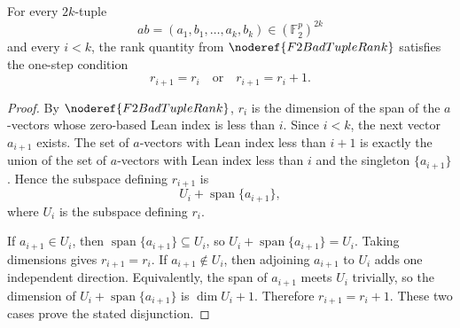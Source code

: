 \begin{helper}
For every \(2k\)-tuple
\[
  ab=(a_1,b_1,\ldots,a_k,b_k)\in(\mathbb F_2^p)^{2k}
\]
and every \(i<k\), the rank quantity from \(\noderef{F2BadTupleRank}\)
satisfies the one-step condition
\[
  r_{i+1}=r_i \quad\text{or}\quad r_{i+1}=r_i+1.
\]
\end{helper}
\begin{proof}
By \(\noderef{F2BadTupleRank}\), \(r_i\) is the dimension of the span of the
\(a\)-vectors whose zero-based Lean index is less than \(i\). Since \(i<k\), the
next vector \(a_{i+1}\) exists. The set of \(a\)-vectors with Lean index less
than \(i+1\) is exactly the union of the set of \(a\)-vectors with Lean index
less than \(i\) and the singleton \(\{a_{i+1}\}\). Hence the subspace defining
\(r_{i+1}\) is
\[
  U_i+\operatorname{span}\{a_{i+1}\},
\]
where \(U_i\) is the subspace defining \(r_i\).

If \(a_{i+1}\in U_i\), then \(\operatorname{span}\{a_{i+1}\}\subseteq U_i\), so
\(U_i+\operatorname{span}\{a_{i+1}\}=U_i\). Taking dimensions gives
\(r_{i+1}=r_i\). If \(a_{i+1}\notin U_i\), then adjoining \(a_{i+1}\) to \(U_i\)
adds one independent direction. Equivalently, the span of \(a_{i+1}\) meets
\(U_i\) trivially, so the dimension of
\(U_i+\operatorname{span}\{a_{i+1}\}\) is \(\dim U_i+1\). Therefore
\(r_{i+1}=r_i+1\). These two cases prove the stated disjunction.
\end{proof}
